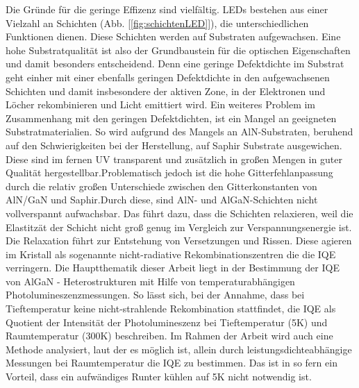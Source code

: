 Die Gründe für die geringe Effizenz sind vielfältig. LEDs bestehen aus einer Vielzahl an Schichten (Abb. [\ref{fig:schichtenLED}]), die unterschiedlichen Funktionen dienen. Diese Schichten werden auf Substraten aufgewachsen. Eine hohe Substratqualität ist also der Grundbaustein für die optischen Eigenschaften und damit besonders entscheidend. Denn eine geringe Defektdichte im Substrat geht einher mit einer ebenfalls geringen Defektdichte in den aufgewachsenen Schichten und damit insbesondere der aktiven Zone, in der Elektronen und Löcher rekombinieren und Licht emittiert wird. Ein weiteres Problem im Zusammenhang mit den geringen Defektdichten, ist ein Mangel an geeigneten Substratmaterialien. So wird aufgrund des Mangels an AlN-Substraten, beruhend auf den Schwierigkeiten bei der Herstellung, auf Saphir Substrate ausgewichen. Diese sind im fernen UV transparent und zusätzlich in großen Mengen in guter Qualität hergestellbar.Problematisch jedoch ist die hohe Gitterfehlanpassung durch die relativ großen Unterschiede zwischen den Gitterkonstanten von AlN/GaN und Saphir.Durch diese, sind AlN- und AlGaN-Schichten nicht vollverspannt aufwachsbar. Das führt dazu, dass die Schichten relaxieren, weil die Elastitzät der Schicht nicht groß genug im Vergleich zur Verspannungsenergie ist. Die Relaxation führt zur Entstehung von Versetzungen und Rissen. Diese agieren im Kristall als sogenannte nicht-radiative Rekombinationszentren die die 
IQE verringern. Die Hauptthematik dieser Arbeit liegt in der  Bestimmung der IQE von AlGaN - Heterostrukturen mit Hilfe von temperaturabhängigen Photolumineszenzmessungen. So lässt sich, bei der Annahme, dass bei Tieftemperatur keine nicht-strahlende Rekombination stattfindet, die IQE als Quotient der Intensität der Photolumineszenz bei Tieftemperatur (5K) und Raumtemperatur (300K) beschreiben. Im Rahmen der Arbeit wird auch eine Methode analysiert, laut der es möglich ist, allein durch leistungsdichteabhängige Messungen bei Raumtemperatur die IQE zu bestimmen. Das ist in so fern ein Vorteil, dass ein aufwändiges Runter kühlen auf 5K nicht notwendig ist. 














